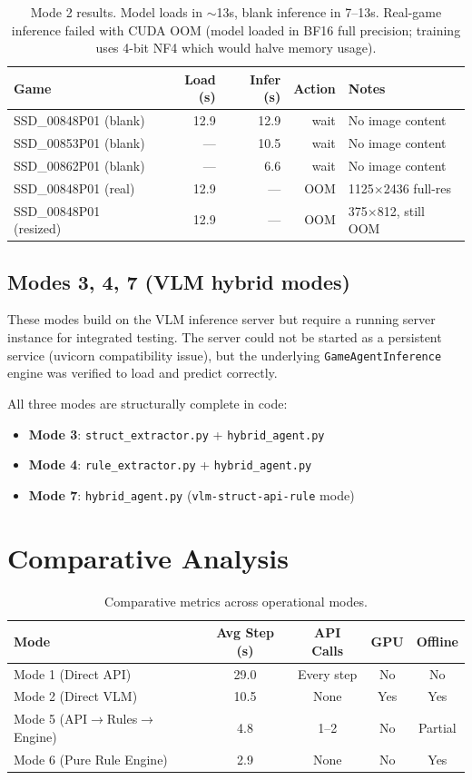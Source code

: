 \documentclass[11pt,a4paper]{article}
\begin{document}
\begin{table}[H]
\centering
\begin{tabular}{lrrrl}
\toprule
Game & Load (s) & Infer (s) & Action & Notes \\
\midrule
SSD\_00848P01 (blank) & 12.9 & 12.9 & wait & No image content \\
SSD\_00853P01 (blank) & --- & 10.5 & wait & No image content \\
SSD\_00862P01 (blank) & --- & 6.6 & wait & No image content \\
SSD\_00848P01 (real) & 12.9 & --- & OOM & 1125$\times$2436 full-res \\
SSD\_00848P01 (resized) & 12.9 & --- & OOM & 375$\times$812, still OOM \\
\bottomrule
\end{tabular}
\caption{Mode 2 results. Model loads in $\sim$13s, blank inference in 7--13s. 
Real-game inference failed with CUDA OOM (model loaded in BF16 full precision; 
training uses 4-bit NF4 which would halve memory usage).}
\end{table}

\subsection{Modes 3, 4, 7 (VLM hybrid modes)}
These modes build on the VLM inference server but require a running server instance 
for integrated testing. The server could not be started as a persistent service 
(uvicorn compatibility issue), but the underlying \texttt{GameAgentInference} engine 
was verified to load and predict correctly.

All three modes are structurally complete in code:
\begin{itemize}
  \item \textbf{Mode 3}: \texttt{struct\_extractor.py} + \texttt{hybrid\_agent.py}
  \item \textbf{Mode 4}: \texttt{rule\_extractor.py} + \texttt{hybrid\_agent.py}
  \item \textbf{Mode 7}: \texttt{hybrid\_agent.py} (\texttt{vlm-struct-api-rule} mode)
\end{itemize}

\section{Comparative Analysis}

\begin{table}[H]
\centering
\begin{tabular}{lcccc}
\toprule
Mode & Avg Step (s) & API Calls & GPU & Offline \\
\midrule
Mode 1 (Direct API) & 29.0 & Every step & No & No \\
Mode 2 (Direct VLM) & 10.5 & None & Yes & Yes \\
Mode 5 (API$\to$Rules$\to$Engine) & 4.8 & 1--2 & No & Partial \\
Mode 6 (Pure Rule Engine) & 2.9 & None & No & Yes \\
\bottomrule
\end{tabular}
\caption{Comparative metrics across operational modes.}
\end{table}
\end{document}
